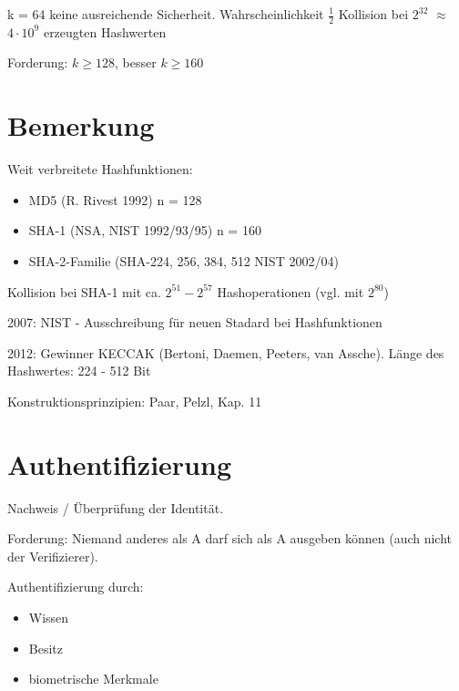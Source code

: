   k = 64 keine ausreichende Sicherheit. Wahrscheinlichkeit $\frac{1}{2}$ Kollision bei $2^{32}$ $\approx$ $4 \cdot 10^9$ erzeugten Hashwerten

  \par \medskip

  Forderung: $k \ge 128$, besser $k \ge 160$

  \section{Bemerkung}

  Weit verbreitete Hashfunktionen:

  \begin{itemize}
    \item MD5 (R. Rivest 1992) n = 128
    \item SHA-1 (NSA, NIST 1992/93/95) n = 160
    \item SHA-2-Familie (SHA-224, 256, 384, 512 NIST 2002/04)
  \end{itemize} 

  Kollision bei SHA-1 mit ca. $2^{51} - 2^{57}$ Hashoperationen (vgl. mit $2^{80}$)

  \par \medskip

  2007: NIST - Ausschreibung für neuen Stadard bei Hashfunktionen

  2012: Gewinner KECCAK (Bertoni, Daemen, Peeters, van Assche). Länge des Hashwertes: 224 - 512 Bit 

  Konstruktionsprinzipien: Paar, Pelzl, Kap. 11

  \section{Authentifizierung}

  Nachweis / Überprüfung der Identität.

  Forderung: Niemand anderes als A darf sich als A ausgeben können (auch nicht der Verifizierer).

  \par \medskip

  Authentifizierung durch:

  \begin{itemize}
    \item Wissen
    \item Besitz
    \item biometrische Merkmale
  \end{itemize}

